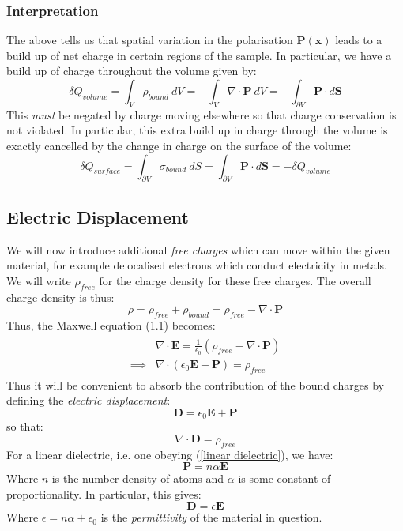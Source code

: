 \documentclass[a4paper]{article}
\numberwithin{equation}{section}
\begin{document}
\subsubsection{Interpretation}
The above tells us that spatial variation in the polarisation $\mathbf{P}(\mathbf{x})$ leads to a build up of net charge in certain regions of the sample. In particular, we have a build up of charge throughout the volume given by:
\begin{equation}
\delta Q_{volume} = \int_V \rho_{bound} \ dV = -\int_V \nabla \cdot \mathbf{P} \ dV = -\int_{\partial V} \mathbf{P} \cdot d\mathbf{S}
\end{equation}
This \textit{must} be negated by charge moving elsewhere so that charge conservation is not violated. In particular, this extra build up in charge through the volume is exactly cancelled by the change in charge on the surface of the volume:
\begin{equation}
\delta Q_{surface} = \int_{\partial V} \sigma_{bound} \ dS = \int_{\partial V} \mathbf{P} \cdot d\mathbf{S} = -\delta Q_{volume}
\end{equation} 

\subsection{Electric Displacement} \label{electric displacement}
We will now introduce additional \textit{free charges} which can move within the given material, for example delocalised electrons which conduct electricity in metals. We will write $\rho_{free}$ for the charge density for these free charges. The overall charge density is thus:
\begin{equation}
\rho=\rho_{free}+\rho_{bound} = \rho_{free} - \nabla \cdot \mathbf{P}
\end{equation}
Thus, the Maxwell equation (1.1) becomes:
\begin{align}
\begin{split}
&\nabla \cdot \mathbf{E} = \frac{1}{\epsilon_0}(\rho_{free}-\nabla \cdot \mathbf{P}) \\
\implies& \nabla \cdot (\epsilon_0 \mathbf{E} + \mathbf{P})  = \rho_{free}
\end{split}
\end{align}
Thus it will be convenient to absorb the contribution of the bound charges by defining the \textit{electric displacement}:
\begin{equation}
\mathbf{D} = \epsilon_0 \mathbf{E} + \mathbf{P}
\end{equation}
so that:
\begin{equation}
\nabla \cdot \mathbf{D} = \rho_{free}
\end{equation}
For a linear dielectric, i.e. one obeying (\ref{linear dielectric}), we have:
\begin{equation}
\mathbf{P} = n \alpha \mathbf{E}
\end{equation}
Where $n$ is the number density of atoms and $\alpha$ is some constant of proportionality. In particular, this gives:
\begin{equation}
\mathbf{D}=\epsilon \mathbf{E}
\end{equation}
Where $\epsilon = n \alpha + \epsilon_0$ is the \textit{permittivity} of the material in question.
\end{document}
